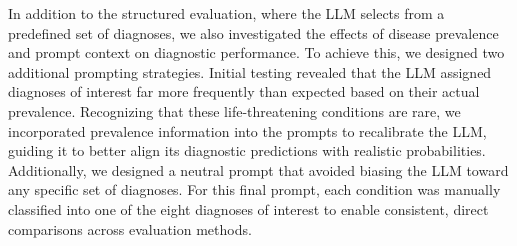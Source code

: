 In addition to the structured evaluation, where the LLM selects from a predefined set of diagnoses, we also investigated the effects of disease prevalence and prompt context on diagnostic performance. To achieve this, we designed two additional prompting strategies. Initial testing revealed that the LLM assigned diagnoses of interest far more frequently than expected based on their actual prevalence. Recognizing that these life-threatening conditions are rare, we incorporated prevalence information into the prompts to recalibrate the LLM, guiding it to better align its diagnostic predictions with realistic probabilities. Additionally, we designed a neutral prompt that avoided biasing the LLM toward any specific set of diagnoses. For this final prompt, each condition was manually classified into one of the eight diagnoses of interest to enable consistent, direct comparisons across evaluation methods. %

